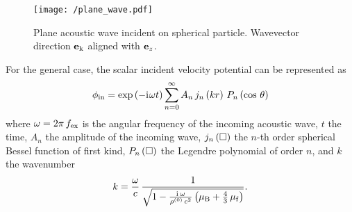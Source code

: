 \begin{figure}[tbp]
  \centering
  \texttt{[image: /plane\_wave.pdf]}
  \caption{Plane acoustic wave incident on spherical particle. Wavevector 
  direction $\vb{e}_{\mathrm{k}}$ aligned with $\vb{e}_{z}$.}
  \label{fig:TA-plane_wave}
\end{figure}

For the general case, the scalar incident velocity potential can be represented 
as
\begin{equation}
  \phi_{\mathrm{in}} = \exp\left( -\mathrm{i}\mkern1mu\omega t \right) \sum\limits_{n=0}^{\infty} 
  A_{n}\,j_{n}\left(kr\right)\,P_{n}\left(\cos\,\theta\right)
  \label{eq:TA-incident-field}
\end{equation}
where $\omega=2\pi\,f_{\mathrm{ex}}$ is the angular frequency of the incoming acoustic 
wave, $t$ the time, $A_{n}$ the amplitude of the incoming wave, 
$j_{n}\left(\Box\right)$ the $n$-th order spherical Bessel function of first kind, 
$P_{n}\left(\Box\right)$ the Legendre polynomial of order $n$, and $k$ the 
wavenumber
\begin{equation}
  k = 
  \frac{\omega}{c}\,\frac{1}{\sqrt{1-\frac{\mathrm{i}\mkern1mu\,\omega}{\rho^{(0)}\,c^{2}} 
  \left( \mu_{\mathrm{B}} + \frac{4}{3}\,\mu_{\mathrm{f}} \right)}}.
  \label{eq:TA-wavenumber}
\end{equation}

